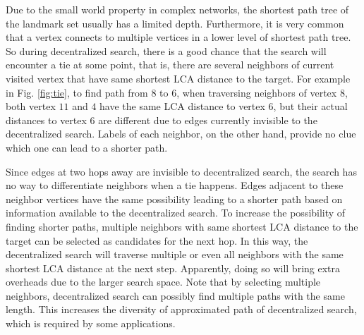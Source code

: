 Due to the small world property in complex networks, the shortest path tree of the landmark set usually has a limited depth. Furthermore, it is very common that a vertex connects to multiple vertices in a lower level of shortest path tree. So during decentralized search, there is a good chance that the search will encounter a tie at some point, that is, there are several neighbors of current visited vertex that have same shortest LCA distance to the target. For example in Fig. \ref{fig:tie}, to find path from $8$ to $6$, when traversing neighbors of vertex $8$, both vertex $11$ and $4$ have the same LCA distance to vertex $6$, but their actual distances to vertex $6$ are different due to edges currently invisible to the decentralized search. Labels of each neighbor, on the other hand, provide no clue which one can lead to a shorter path.

Since edges at two hops away are invisible to decentralized search, the search has no way to differentiate neighbors when a tie happens. Edges adjacent to these neighbor vertices have the same possibility leading to a shorter path based on information available to the decentralized search. To increase the possibility of finding shorter paths, multiple neighbors with same shortest LCA distance to the target can be selected as candidates for the next hop. In this way, the decentralized search will traverse multiple or even all neighbors with the same shortest LCA distance at the next step. Apparently, doing so will bring extra overheads due to the larger search space. Note that by selecting multiple neighbors, decentralized search can possibly find multiple paths with the same length. This increases the diversity of approximated path of decentralized search, which is required by some applications. 